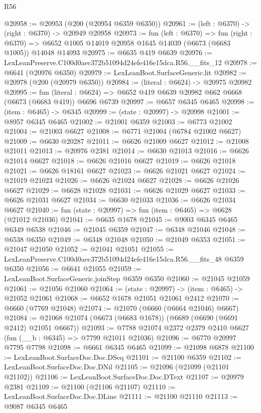 \begin{lexlean}{R56}
\begin{coremodule}
@20958 := @20953 (@200 (@20954 @6359 @6350))
@20961 := (left : @6370) -> (right : @6370) -> @20949 @20958
@20973 := fun (left : @6370) =>
  fun (right : @6370) => @6652 @1005 @14019 @20958 @1645 @14039 (@6673 (@6683 @1005)) @14048 @14093
@20975 := @6635 @419 @6639
@20976 := LexLeanPreserve.C100d0aec372b51094d24efe416e15dca.R56.__fits_12
@20978 := @6641 (@20976 @6350)
@20979 := LexLeanBoot.SurfaceGeneric.lit
@20982 := @20978 (@200 (@20979 @6350))
@20984 := (literal : @6624) -> @20975 @20982
@20995 := fun (literal : @6624) =>
  @6652 @419 @6639 @20982 @662 @6668 (@6673 (@6683 @419)) @6696 @6739
@20997 := @6657 @6345 @6465
@20998 := (item : @6465) -> @6345
@20999 := (state : @20997) -> @20998
@21001 := @8957 @6345 @6465
@21002 := @21001 @6359
@21003 := @6773 @21002
@21004 := @21003 @6627
@21008 := @6771 @21004 (@6784 @21002 @6627)
@21009 := @6630 @20287
@21011 := @6626 @21009 @6627
@21012 := @21008 @21011
@21013 := @20976 @2381
@21014 := @6630 @21013
@21016 := @6626 @21014 @6627
@21018 := @6626 @21016 @6627
@21019 := @6626 @21018
@21021 := @6626 @18161 @6627
@21023 := @6626 @21021 @6627
@21024 := @21019 @21023
@21026 := @6626 @21024 @6627
@21028 := @6626 @21026 @6627
@21029 := @6628 @21028
@21031 := @6626 @21029 @6627
@21033 := @6626 @21031 @6627
@21034 := @6630 @21033
@21036 := @6626 @21034 @6627
@21040 := fun (state : @20997) => fun (item : @6465) => @6628 (@21012 @21036)
@21041 := @6635 @1678
@21045 := @9003 @6345 @6465 @6349 @6538
@21046 := @21045 @6359
@21047 := @6348 @21046
@21048 := @6538 @6350
@21049 := @6348 @21048
@21050 := @21049 @6353
@21051 := @21047 @21050
@21052 := @21041 @21051
@21055 := LexLeanPreserve.C100d0aec372b51094d24efe416e15dca.R56.__fits_48 @6359 @6350
@21056 := @6641 @21055
@21059 := LexLeanBoot.SurfaceGeneric.joinStep @6359 @6350
@21060 := @21045 @21059
@21061 := @21056 @21060
@21064 := (state : @20997) -> (item : @6465) -> @21052 @21061
@21068 := @6652 @1678 @21051 @21061 @2412
@21070 := @6660 (@7769 @21048)
@21074 := @21070 (@6660 (@6664 @21046) @6667)
@21084 := @21068 @21074 (@6673 (@6683 @1678)) (@6689 (@6690 (@6691 @2412) @21051 @6667))
@21093 := @7788 @21074 @2372 @2379 @2410 @6627 (fun (__b : @6345) => @7799 @21011 @21036)
@21096 := @6770 @20997 @7795 @7798
@21098 := @6661 @6345 @6465
@21099 := @21098 @6878
@21100 := LexLeanBoot.SurfaceDoc.Doc.DSeq
@21101 := @21100 @6359
@21102 := LexLeanBoot.SurfaceDoc.Doc.DNil
@21105 := @21096 (@21099 (@21101 @21102))
@21106 := LexLeanBoot.SurfaceDoc.Doc.DText
@21107 := @20979 @2381
@21109 := @21100 (@21106 @21107)
@21110 := LexLeanBoot.SurfaceDoc.Doc.DLine
@21111 := @21100 @21110
@21113 := @9087 @6345 @6465

\end{coremodule}
\end{lexlean}
